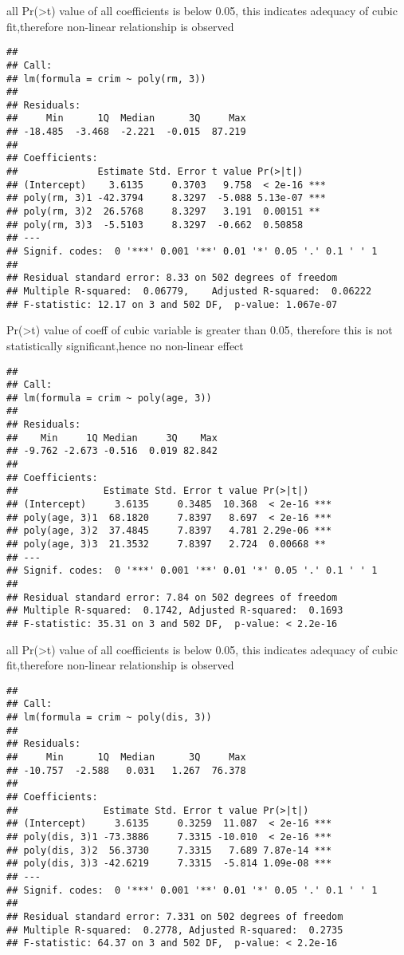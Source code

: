 \documentclass[
]{article}
\begin{document}
all Pr(\textgreater\textbar t\textbar) value of all coefficients is
below 0.05, this indicates adequacy of cubic fit,therefore non-linear
relationship is observed

\begin{verbatim}
## 
## Call:
## lm(formula = crim ~ poly(rm, 3))
## 
## Residuals:
##     Min      1Q  Median      3Q     Max 
## -18.485  -3.468  -2.221  -0.015  87.219 
## 
## Coefficients:
##              Estimate Std. Error t value Pr(>|t|)    
## (Intercept)    3.6135     0.3703   9.758  < 2e-16 ***
## poly(rm, 3)1 -42.3794     8.3297  -5.088 5.13e-07 ***
## poly(rm, 3)2  26.5768     8.3297   3.191  0.00151 ** 
## poly(rm, 3)3  -5.5103     8.3297  -0.662  0.50858    
## ---
## Signif. codes:  0 '***' 0.001 '**' 0.01 '*' 0.05 '.' 0.1 ' ' 1
## 
## Residual standard error: 8.33 on 502 degrees of freedom
## Multiple R-squared:  0.06779,    Adjusted R-squared:  0.06222 
## F-statistic: 12.17 on 3 and 502 DF,  p-value: 1.067e-07
\end{verbatim}

Pr(\textgreater\textbar t\textbar) value of coeff of cubic variable is
greater than 0.05, therefore this is not statistically significant,hence
no non-linear effect

\begin{verbatim}
## 
## Call:
## lm(formula = crim ~ poly(age, 3))
## 
## Residuals:
##    Min     1Q Median     3Q    Max 
## -9.762 -2.673 -0.516  0.019 82.842 
## 
## Coefficients:
##               Estimate Std. Error t value Pr(>|t|)    
## (Intercept)     3.6135     0.3485  10.368  < 2e-16 ***
## poly(age, 3)1  68.1820     7.8397   8.697  < 2e-16 ***
## poly(age, 3)2  37.4845     7.8397   4.781 2.29e-06 ***
## poly(age, 3)3  21.3532     7.8397   2.724  0.00668 ** 
## ---
## Signif. codes:  0 '***' 0.001 '**' 0.01 '*' 0.05 '.' 0.1 ' ' 1
## 
## Residual standard error: 7.84 on 502 degrees of freedom
## Multiple R-squared:  0.1742, Adjusted R-squared:  0.1693 
## F-statistic: 35.31 on 3 and 502 DF,  p-value: < 2.2e-16
\end{verbatim}

all Pr(\textgreater\textbar t\textbar) value of all coefficients is
below 0.05, this indicates adequacy of cubic fit,therefore non-linear
relationship is observed

\begin{verbatim}
## 
## Call:
## lm(formula = crim ~ poly(dis, 3))
## 
## Residuals:
##     Min      1Q  Median      3Q     Max 
## -10.757  -2.588   0.031   1.267  76.378 
## 
## Coefficients:
##               Estimate Std. Error t value Pr(>|t|)    
## (Intercept)     3.6135     0.3259  11.087  < 2e-16 ***
## poly(dis, 3)1 -73.3886     7.3315 -10.010  < 2e-16 ***
## poly(dis, 3)2  56.3730     7.3315   7.689 7.87e-14 ***
## poly(dis, 3)3 -42.6219     7.3315  -5.814 1.09e-08 ***
## ---
## Signif. codes:  0 '***' 0.001 '**' 0.01 '*' 0.05 '.' 0.1 ' ' 1
## 
## Residual standard error: 7.331 on 502 degrees of freedom
## Multiple R-squared:  0.2778, Adjusted R-squared:  0.2735 
## F-statistic: 64.37 on 3 and 502 DF,  p-value: < 2.2e-16
\end{verbatim}
\end{document}
